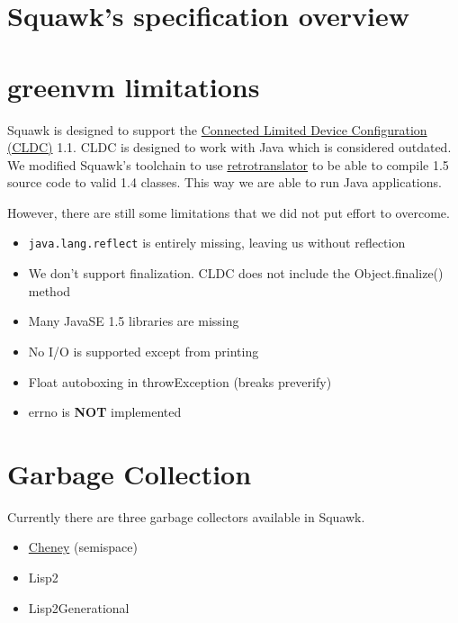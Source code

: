 \documentclass[
a4paper,
12pt,
]{report}
\newcommand{\gvm}{{\fontfamily{fco}\selectfont\textbf{\color{g}green\color{v}vm}}\xspace}
\newcommand{\java}{Java\texttrademark\xspace}
\begin{document}
\section{Squawk's specification overview}

\section{\gvm limitations}

Squawk is designed to support the
\href{https://en.wikipedia.org/wiki/CLDC}{Connected Limited Device
  Configuration (CLDC)} 1.1.  CLDC is designed to work with \java 1.4
which is considered outdated.  We modified Squawk's toolchain to use
\href{http://retrotranslator.sourceforge.net/}{retrotranslator} to be
able to compile 1.5 source code to valid 1.4 classes.  This way we are
able to run \java 1.5 applications.

However, there are still some limitations that we did not put effort
to overcome.

\begin{itemize}
\item \verb!java.lang.reflect! is entirely missing, leaving us without
  reflection
\item We don't support finalization. CLDC does not include the
  Object.finalize() method
\item Many JavaSE 1.5 libraries are missing
\item No I/O is supported except from printing
\item Float autoboxing in throwException (breaks preverify)
\item errno is \textbf{NOT} implemented

\end{itemize}

\section{Garbage Collection}

Currently there are three garbage collectors available in Squawk.

\begin{itemize}
\item \href{https://en.wikipedia.org/wiki/Cheney%27s_algorithm}{Cheney} (semispace)
\item Lisp2
\item Lisp2Generational
\end{itemize}
\end{document}
